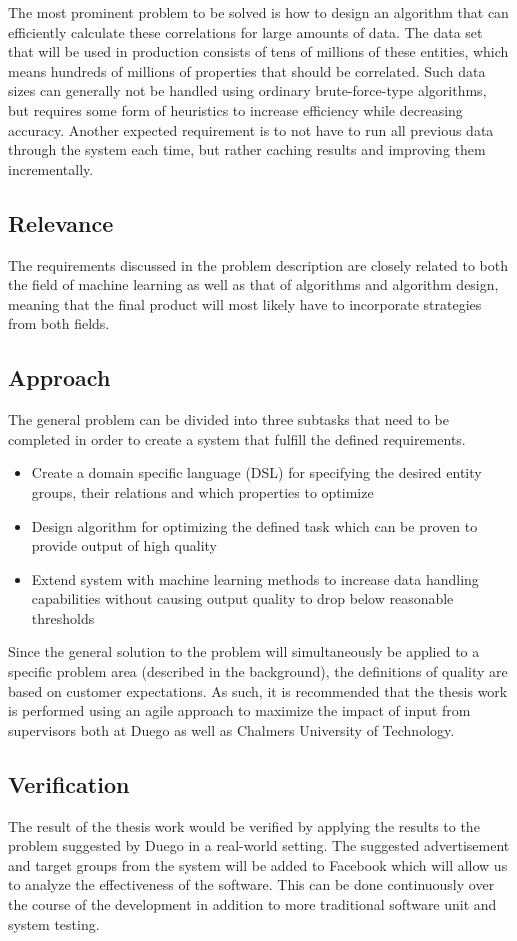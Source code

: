 \documentclass[a4paper]{article}
\begin{document}
The most prominent problem to be solved is how to design an algorithm that can efficiently calculate these correlations for 
large amounts of data. The data set that will be used in production consists of tens of millions of these entities, which 
means hundreds of millions of properties that should be correlated. Such data sizes can generally not be handled using 
ordinary brute-force-type algorithms, but requires some form of heuristics to increase efficiency while decreasing accuracy. 
Another expected requirement is to not have to run all previous data through the system each time, but rather caching results 
and improving them incrementally.

\subsection{Relevance}
The requirements discussed in the problem description are closely related to both the field of machine learning as well as 
that of algorithms and algorithm design, meaning that the final product will most likely have to incorporate strategies from 
both fields.

\subsection{Approach}
\label{sec:approach}
The general problem can be divided into three subtasks that need to be completed in order to create a system that fulfill the defined requirements.
\begin{itemize}
	\item Create a domain specific language (DSL) for specifying the desired entity groups, their relations and which properties to optimize
	\item Design algorithm for optimizing the defined task which can be proven to provide output of high quality 
	\item Extend system with machine learning methods to increase data handling capabilities without causing output quality to drop below reasonable thresholds
\end{itemize}
Since the general solution to the problem will simultaneously be applied to a specific problem area (described in the background), the definitions of quality are based on customer expectations. As such, it is recommended that the thesis work is performed using an agile approach to maximize the impact of input from supervisors both at Duego as well as Chalmers University of Technology.

\subsection{Verification}
The result of the thesis work would be verified by applying the results to the problem suggested by Duego in a real-world setting. The suggested advertisement and target groups from the system will be added to Facebook which will allow us to analyze the effectiveness of the software. This can be done continuously over the course of the development in addition to more traditional software unit and system testing.


\end{document}
